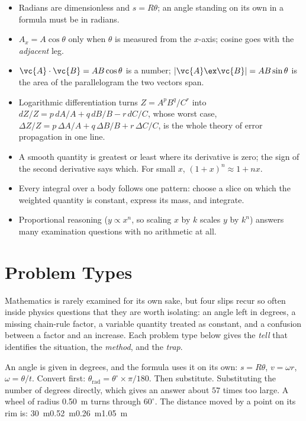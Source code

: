 \begin{itemize}
\item Radians are dimensionless and $s=R\theta$; an angle standing on its own in a formula must be in
      radians.
\item $A_x=A\cos\theta$ only when $\theta$ is measured from the $x$-axis; cosine goes with the
      \emph{adjacent} leg.
\item $\vc{A}\cdot\vc{B}=AB\cos\theta$ is a number; $|\vc{A}\ex\vc{B}|=AB\sin\theta$ is the area of the
      parallelogram the two vectors span.
\item Logarithmic differentiation turns $Z=A^pB^q/C^r$ into $dZ/Z=p\,dA/A+q\,dB/B-r\,dC/C$, whose
      worst case, $\Delta Z/Z=p\,\Delta A/A+q\,\Delta B/B+r\,\Delta C/C$, is the whole theory of error
      propagation in one line.
\item A smooth quantity is greatest or least where its derivative is zero; the sign of the second
      derivative says which. For small $x$, $(1+x)^n\approx1+nx$.
\item Every integral over a body follows one pattern: choose a slice on which the weighted quantity is
      constant, express its mass, and integrate.
\item Proportional reasoning ($y\propto x^n$, so scaling $x$ by $k$ scales $y$ by $k^n$) answers many
      examination questions with no arithmetic at all.
\end{itemize}

\section{Problem Types}\label{sec:types0}
Mathematics is rarely examined for its own sake, but four slips recur so often inside physics questions
that they are worth isolating: an angle left in degrees, a missing chain-rule factor, a variable
quantity treated as constant, and a confusion between a factor and an increase. Each problem type below
gives the \emph{tell} that identifies the situation, the \emph{method}, and the \emph{trap}.

{An angle is given in degrees, and the formula uses it on its own: $s=R\theta$, $v=\omega r$,
$\omega=\theta/t$.}
{Convert first: $\theta_{\text{rad}}=\theta^\circ\times\pi/180$. Then substitute.}
{Substituting the number of degrees directly, which gives an answer about $57$ times too large.}
{A wheel of radius \SI{0.50}{m} turns through $60^\circ$. The distance moved by a point on its rim is:}
{\SI{30}{m}}{\SI{0.52}{m}}{\SI{0.26}{m}}{\SI{1.05}{m}}

